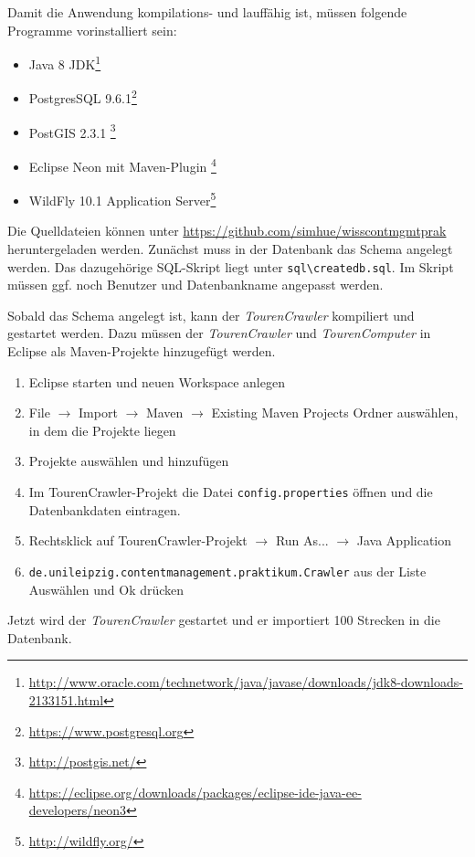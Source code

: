 \documentclass[a4paper,11pt,utf8]{scrartcl}
\begin{document}
Damit die Anwendung kompilations- und lauffähig ist, müssen folgende Programme vorinstalliert sein:

\begin{itemize}
	\item Java 8 JDK\footnote{\url{http://www.oracle.com/technetwork/java/javase/downloads/jdk8-downloads-2133151.html}}
	\item PostgresSQL 9.6.1\footnote{\url{https://www.postgresql.org}}
	\item PostGIS 2.3.1 \footnote{\url{http://postgis.net/}}
	\item Eclipse Neon mit Maven-Plugin \footnote{\url{https://eclipse.org/downloads/packages/eclipse-ide-java-ee-developers/neon3}}
	\item WildFly 10.1 Application Server\footnote{\url{http://wildfly.org/}}
\end{itemize}

Die Quelldateien können unter \url{https://github.com/simhue/wisscontmgmtprak} heruntergeladen werden. Zunächst muss in der Datenbank das Schema angelegt werden. Das dazugehörige SQL-Skript liegt unter \texttt{sql\textbackslash{}createdb.sql}. Im Skript müssen ggf. noch Benutzer und Datenbankname angepasst werden. 

Sobald das Schema angelegt ist, kann der \textit{TourenCrawler} kompiliert und gestartet werden. Dazu müssen der \textit{TourenCrawler} und \textit{TourenComputer} in Eclipse als Maven-Projekte hinzugefügt werden. 

\begin{enumerate}
	\item Eclipse starten und neuen Workspace anlegen
	\item File $\rightarrow$ Import $\rightarrow$ Maven $\rightarrow$ Existing Maven Projects  Ordner auswählen, in dem die Projekte liegen
	\item Projekte auswählen und hinzufügen
	\item Im TourenCrawler-Projekt die Datei \texttt{config.properties} öffnen und die Datenbankdaten eintragen.
	\item Rechtsklick auf TourenCrawler-Projekt $\rightarrow$ Run As... $\rightarrow$ Java Application
	\item \texttt{de.unileipzig.contentmanagement.praktikum.Crawler} aus der Liste Auswählen und Ok drücken
\end{enumerate}

Jetzt wird der \textit{TourenCrawler} gestartet und er importiert 100 Strecken in die Datenbank.
\end{document}
